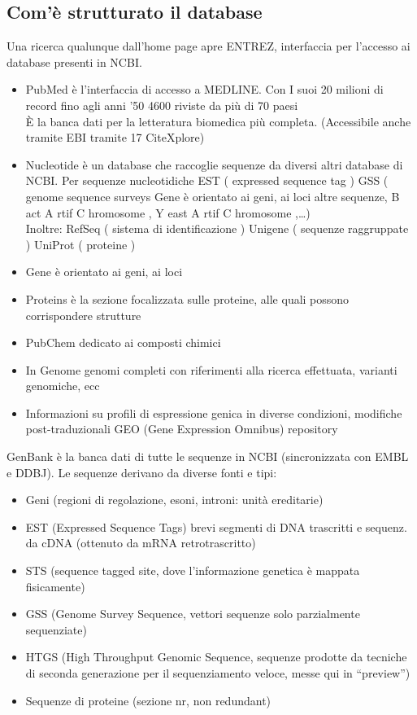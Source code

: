 \documentclass{article}
\begin{document}
\subsection{Com'è strutturato il database}
Una ricerca qualunque dall'home page apre ENTREZ,
interfaccia per l'accesso ai database presenti in NCBI.\\
\begin{itemize}
    \item PubMed è l'interfaccia di accesso a
    MEDLINE.
    Con I suoi
    \subitem{-} 20 milioni di record fino agli anni '50
    \subitem{-} 4600 riviste da più di 70 paesi\\
    È la banca dati per la letteratura
    biomedica più completa.
    (Accessibile anche tramite EBI tramite 17 CiteXplore)
    \item Nucleotide è un database che
    raccoglie sequenze da diversi altri
    database di NCBI.
    Per sequenze nucleotidiche
    \subitem{-} EST ( expressed sequence tag )
    \subitem{-} GSS ( genome sequence surveys
    Gene è orientato ai geni, ai loci
    altre sequenze, B act A rtif C hromosome ,
    Y east A rtif C hromosome ,\dots)\\
    Inoltre:
    \subitem{-} RefSeq ( sistema di
    identificazione )
    \subitem{-} Unigene ( sequenze raggruppate )
    \subitem{-} UniProt ( proteine )
    \item Gene è orientato ai geni, ai loci
    \item Proteins è la sezione focalizzata sulle
    proteine, alle quali possono
    corrispondere strutture
    \item PubChem dedicato ai composti chimici
    \item In Genome genomi completi con riferimenti alla
    ricerca effettuata, varianti genomiche,
    ecc
    \item Informazioni su profili di espressione
    genica in diverse condizioni, modifiche
    post-traduzionali
    GEO (Gene Expression Omnibus)
    repository
\end{itemize}
GenBank è la banca dati di tutte le sequenze in NCBI (sincronizzata con
EMBL e DDBJ). Le sequenze derivano da diverse fonti e tipi:
\begin{itemize}
    \item Geni (regioni di regolazione, esoni, introni: unità ereditarie)
    \item EST (Expressed Sequence Tags)
    brevi segmenti di DNA trascritti e sequenz. da cDNA (ottenuto da
    mRNA retrotrascritto)
    \item STS (sequence tagged site, dove l'informazione genetica è mappata
    fisicamente)
    \item GSS (Genome Survey Sequence, vettori sequenze solo parzialmente sequenziate)
    \item HTGS (High Throughput Genomic Sequence, sequenze prodotte da tecniche di
    seconda generazione per il sequenziamento veloce, messe qui in “preview”)
    \item Sequenze di proteine (sezione nr, non redundant)
\end{itemize}
\end{document}
